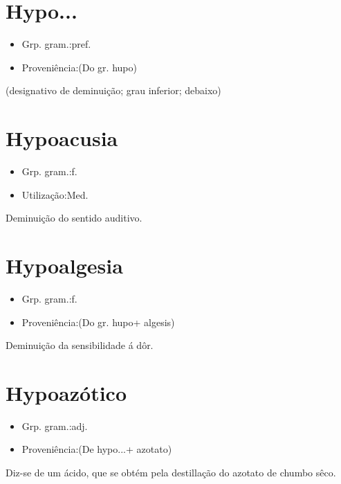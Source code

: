 \documentclass{article}
\begin{document}
\section{Hypo...}
\begin{itemize}
\item {Grp. gram.:pref.}
\end{itemize}
\begin{itemize}
\item {Proveniência:(Do gr. \textunderscore hupo\textunderscore )}
\end{itemize}
(designativo de \textunderscore deminuição\textunderscore ; \textunderscore grau inferior\textunderscore ; \textunderscore debaixo\textunderscore )
\section{Hypoacusia}
\begin{itemize}
\item {Grp. gram.:f.}
\end{itemize}
\begin{itemize}
\item {Utilização:Med.}
\end{itemize}
Deminuição do sentido auditivo.
\section{Hypoalgesia}
\begin{itemize}
\item {Grp. gram.:f.}
\end{itemize}
\begin{itemize}
\item {Proveniência:(Do gr. \textunderscore hupo\textunderscore  + \textunderscore algesis\textunderscore )}
\end{itemize}
Deminuição da sensibilidade á dôr.
\section{Hypoazótico}
\begin{itemize}
\item {Grp. gram.:adj.}
\end{itemize}
\begin{itemize}
\item {Proveniência:(De \textunderscore hypo...\textunderscore  + \textunderscore azotato\textunderscore )}
\end{itemize}
Diz-se de um ácido, que se obtém pela destillação do azotato de chumbo sêco.
\end{document}
